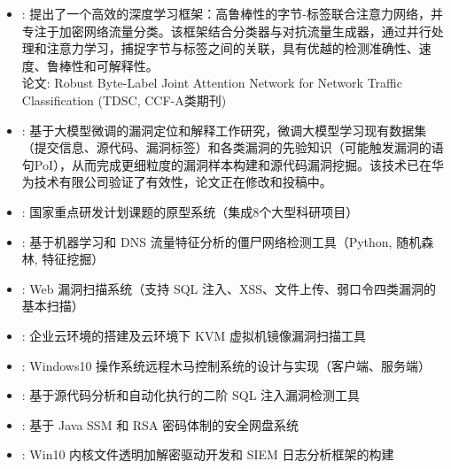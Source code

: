 \documentclass[zh]{resume}
\begin{document}
{}
\vspace{-0.2cm}
\begin{itemize}
  \item {}:
    提出了一个高效的深度学习框架：高鲁棒性的字节-标签联合注意力网络，并专注于加密网络流量分类。该框架结合分类器与对抗流量生成器，通过并行处理和注意力学习，捕捉字节与标签之间的关联，具有优越的检测准确性、速度、鲁棒性和可解释性。\\
    论文: Robust Byte-Label Joint Attention Network for Network Traffic Classification (TDSC, CCF-A类期刊)
  \item {}:
    基于大模型微调的漏洞定位和解释工作研究，微调大模型学习现有数据集（提交信息、源代码、漏洞标签）和各类漏洞的先验知识（可能触发漏洞的语句PoI），从而完成更细粒度的漏洞样本构建和源代码漏洞挖掘。该技术已在华为技术有限公司验证了有效性，论文正在修改和投稿中。
\end{itemize}
{}
\vspace{-0.2cm}
\begin{itemize}
  \item {}:
    国家重点研发计划课题的原型系统（集成8个大型科研项目）
  \item {}:
    基于机器学习和 DNS 流量特征分析的僵尸网络检测工具（Python, 随机森林, 特征挖掘）
  \item {}:
    Web 漏洞扫描系统（支持 SQL 注入、XSS、文件上传、弱口令四类漏洞的基本扫描）
  \item {}:
    企业云环境的搭建及云环境下 KVM 虚拟机镜像漏洞扫描工具 
  \item {}:
    Windows10 操作系统远程木马控制系统的设计与实现（客户端、服务端）
  \item {}:
    基于源代码分析和自动化执行的二阶 SQL 注入漏洞检测工具 
  \item {}:
    基于 Java SSM 和 RSA 密码体制的安全网盘系统 
  \item {}:
    Win10 内核文件透明加解密驱动开发和 SIEM 日志分析框架的构建 
\end{itemize}
\end{document}
